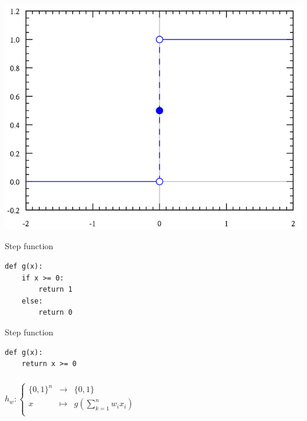 \begin{frame}
  \begin{center}
    \includegraphics[scale=0.4]{./pictures/step_function.png}
  \end{center}
\end{frame}

\begin{frame}[fragile]
  \begin{block}{Step function}
      \begin{lstlisting}
def g(x):
    if x >= 0:
        return 1
    else:
        return 0
      \end{lstlisting}
  \end{block}
\end{frame}

\begin{frame}[fragile]
  \begin{block}{Step function}
      \begin{lstlisting}
def g(x):
    return x >= 0
      \end{lstlisting}
  \end{block}
\end{frame}


\begin{frame}
  \frametitle{}
  $h_w:
  \left \{
    \begin{array}{ccc}
      \{0, 1\}^n & \to & \{0, 1\} \\
      x & \mapsto &
      g\left(\displaystyle\sum_{k = 1}^n{w_i x_i}\right) \\
    \end{array}
  \right.$
\end{frame}


